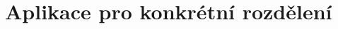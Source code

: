 \documentclass[11pt,a4paper]{beamer}
\newcommand{\amtiT}{\arg \max_{\theta \in \Theta}}
\begin{document}
\section{Aplikace pro konkrétní rozdělení}
%
%
%
%
%
\end{document}
